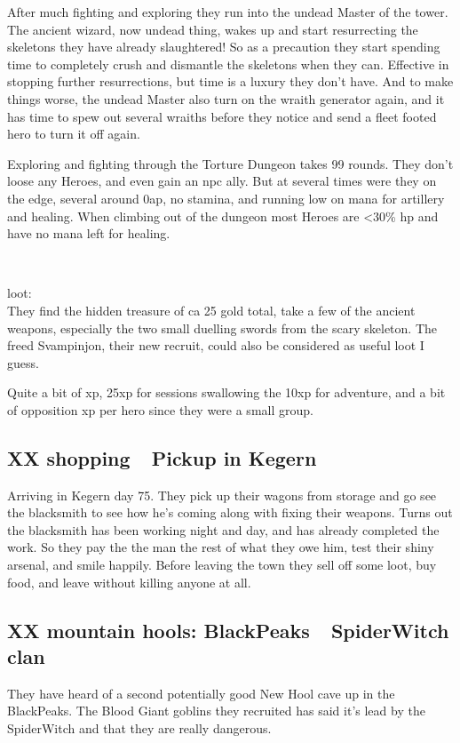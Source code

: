 After much fighting and exploring they run into the undead Master of the tower. The ancient wizard, now undead thing, wakes up and start resurrecting the skeletons they have already slaughtered! So as a precaution they start spending time to completely crush and dismantle the skeletons when they can. Effective in stopping further resurrections, but time is a luxury they don't have.
And to make things worse, the undead Master also turn on the wraith generator again, and it has time to spew out several wraiths before they notice and send a fleet footed hero to turn it off again.

Exploring and fighting through the Torture Dungeon takes 99 rounds. They don't loose any Heroes, and even gain an npc ally. But at several times were they on the edge, several around 0ap, no stamina, and running low on mana for artillery and healing. When climbing out of the dungeon most Heroes are <30\% hp and have no mana left for healing.

\

loot:\\
They find the hidden treasure of ca 25 gold total, take a few of the ancient weapons, especially the two small duelling swords from the scary skeleton.
The freed Svampinjon, their new recruit, could also be considered as useful loot I guess.

Quite a bit of xp, 25xp for sessions swallowing the 10xp for adventure, and a bit of opposition xp per hero since they were a small group.


\subsection*{XX shopping~\mdash~Pickup in Kegern}

Arriving in Kegern day 75. They pick up their wagons from storage and go see the blacksmith to see how he's coming along with fixing their weapons. Turns out the blacksmith has been working night and day, and has already completed the work. So they pay the the man the rest of what they owe him, test their shiny arsenal, and smile happily. Before leaving the town they sell off some loot, buy food, and leave without killing anyone at all.


\subsection*{XX mountain hools: BlackPeaks~\dash~SpiderWitch clan}

They have heard of a second potentially good New Hool cave up in the BlackPeaks. The Blood Giant goblins they recruited has said it's lead by the SpiderWitch and that they are really dangerous.

